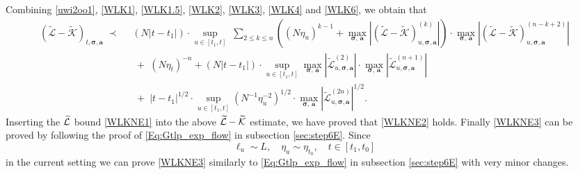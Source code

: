 \documentclass[10pt,reqno]{article}
\theoremstyle{plain} %
\theoremstyle{remark}
\numberwithin{equation}{section}
\begin{document}
Combining \eqref{uwi2oo1}, \eqref{WLK1}, \eqref{WLK1.5}, \eqref{WLK2}, \eqref{WLK3}, \eqref{WLK4} and \eqref{WLK6},   we obtain that 
     \begin{align} \nonumber
    (\mathcal{\widetilde{L}} - \mathcal{\widetilde{K}})_{t, \boldsymbol{\sigma}, \textbf{a}} \;\prec \; \; &
     \left(N|t-t_1|\right)\cdot \sup_{u\in [t_1,t]}\;\sum_{2\le k\le n} \left((N\eta_u)^{k-1}+\max_{\boldsymbol{\sigma}, \,\textbf{a}}   \left|(\mathcal{\widetilde{L}}-\mathcal{\widetilde{K}})^{(k)}_{u, \boldsymbol{\sigma}, \textbf{a}}\right|\right)\cdot \max_{\boldsymbol{\sigma}, \,\textbf{a}}   \left|(\mathcal{\widetilde{L}}-\mathcal{\widetilde{K}})^{(n-k+2)}_{u, \boldsymbol{\sigma}, \textbf{a}}\right| 
    \\\label{WLK8}
    &\;+\;(N\eta_t)^{-n}
    +   \left(N|t-t_1|\right)\cdot \sup_{u\in [t_1,t]} \max_{\boldsymbol{\sigma}, \,\textbf{a}}   \left| \mathcal{\widetilde{L}} ^{(2)}_{u, \boldsymbol{\sigma}, \textbf{a}}\right| \cdot \max_{\boldsymbol{\sigma}, \,\textbf{a}}   \left|\mathcal{\widetilde{L}} ^{(n+1 )} _{u, \boldsymbol{\sigma}, \textbf{a}}\right|
    \\\nonumber
    &\;+\; |t-t_1|^{1/2}\cdot \sup_{u\in [t_1,t]}\left(  N^{-1}\eta_u^{-2}\right)^{1/2} \cdot \max_{\boldsymbol{\sigma}, \,\textbf{a}}   \left|\mathcal{\widetilde{L}} ^{( 2n )} _{u, \boldsymbol{\sigma}, \textbf{a}}\right| ^{1/2}.
    \end{align}  
 Inserting  the $\cal \widetilde{L}$ bound \eqref{WLKNE1} into the above $\cal \widetilde{L}- \cal \widetilde{K}$ estimate, we have proved that  \eqref{WLKNE2} holds. 
Finally  \eqref{WLKNE3} can be proved by following  the proof of \eqref{Eq:Gtlp_exp_flow} in subsection \ref{sec:step6E}. Since    
  $$
  \ell_u\sim L, \quad \eta_u\sim \eta_{t_0}, \quad t\in [t_1,t_0]$$
in the current setting
 we can prove \eqref{WLKNE3} similarly to  \eqref{Eq:Gtlp_exp_flow} in subsection \ref{sec:step6E}  with very minor changes. 
\end{document}

